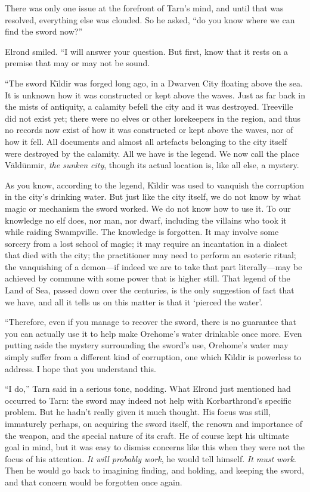 There was only one issue at the forefront of Tarn's mind, and until that was resolved, everything else was clouded.  So he asked, ``do you know where we can find the sword now?''

Elrond smiled.  ``I will answer your question.  But first, know that it rests on a premise that may or may not be sound.

``The sword K\=\i{}ldir was forged long ago, in a Dwarven City floating above the sea.  It is unknown how it was constructed or kept above the waves.  Just as far back in the mists of antiquity, a calamity befell the city and it was destroyed.  Treeville did not exist yet; there were no elves or other lorekeepers in the region, and thus no records now exist of how it was constructed or kept above the waves, nor of how it fell.  All documents and almost all artefacts belonging to the city itself were destroyed by the calamity.  All we have is the legend.  We now call the place V\=ald\=unmir, \emph{the sunken city}, though its actual location is, like all else, a mystery.

As you know, according to the legend, K\=\i{}ldir was used to vanquish the corruption in the city's drinking water.  But just like the city itself, we do not know by what magic or mechanism the sword worked.  We do not know how to use it.  To our knowledge no elf does, nor man, nor dwarf, including the villains who took it while raiding Swampville.  The knowledge is forgotten.  It may involve some sorcery from a lost school of magic; it may require an incantation in a dialect that died with the city; the practitioner may need to perform an esoteric ritual; the vanquishing of a demon---if indeed we are to take that part literally---may be achieved by commune with some power that is higher still.  That legend of the Land of Sea, passed down over the centuries, is the only suggestion of fact that we have, and all it tells us on this matter is that it `pierced the water'.

``Therefore, even if you manage to recover the sword, there is no guarantee that you can actually use it to help make Orehome's water drinkable once more.  Even putting aside the mystery surrounding the sword's use, Orehome's water may simply suffer from a different kind of corruption, one which K\=\i{}ldir is powerless to address.  I hope that you understand this.

``I do,'' Tarn said in a serious tone, nodding.  What Elrond just mentioned had occurred to Tarn: the sword may indeed not help with Korbarthrond's specific problem.  But he hadn't really given it much thought.  His focus was still, immaturely perhaps, on acquiring the sword itself, the renown and importance of the weapon, and the special nature of its craft.  He of course kept his ultimate goal in mind, but it was easy to dismiss concerns like this when they were not the focus of his attention.  \emph{It will probably work}, he would tell himself.  \emph{It must work}.  Then he would go back to imagining finding, and holding, and keeping the sword, and that concern would be forgotten once again.

